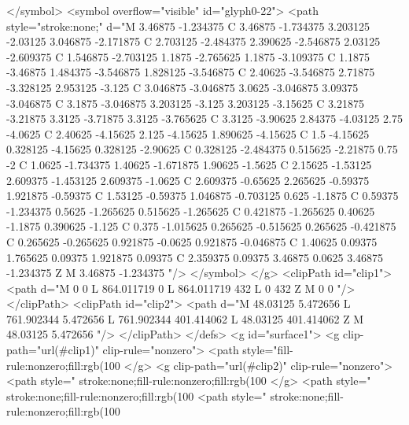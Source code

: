 </symbol>
<symbol overflow="visible" id="glyph0-22">
<path style="stroke:none;" d="M 3.46875 -1.234375 C 3.46875 -1.734375 3.203125 -2.03125 3.046875 -2.171875 C 2.703125 -2.484375 2.390625 -2.546875 2.03125 -2.609375 C 1.546875 -2.703125 1.1875 -2.765625 1.1875 -3.109375 C 1.1875 -3.46875 1.484375 -3.546875 1.828125 -3.546875 C 2.40625 -3.546875 2.71875 -3.328125 2.953125 -3.125 C 3.046875 -3.046875 3.0625 -3.046875 3.09375 -3.046875 C 3.1875 -3.046875 3.203125 -3.125 3.203125 -3.15625 C 3.21875 -3.21875 3.3125 -3.71875 3.3125 -3.765625 C 3.3125 -3.90625 2.84375 -4.03125 2.75 -4.0625 C 2.40625 -4.15625 2.125 -4.15625 1.890625 -4.15625 C 1.5 -4.15625 0.328125 -4.15625 0.328125 -2.90625 C 0.328125 -2.484375 0.515625 -2.21875 0.75 -2 C 1.0625 -1.734375 1.40625 -1.671875 1.90625 -1.5625 C 2.15625 -1.53125 2.609375 -1.453125 2.609375 -1.0625 C 2.609375 -0.65625 2.265625 -0.59375 1.921875 -0.59375 C 1.53125 -0.59375 1.046875 -0.703125 0.625 -1.1875 C 0.59375 -1.234375 0.5625 -1.265625 0.515625 -1.265625 C 0.421875 -1.265625 0.40625 -1.1875 0.390625 -1.125 C 0.375 -1.015625 0.265625 -0.515625 0.265625 -0.421875 C 0.265625 -0.265625 0.921875 -0.0625 0.921875 -0.046875 C 1.40625 0.09375 1.765625 0.09375 1.921875 0.09375 C 2.359375 0.09375 3.46875 0.0625 3.46875 -1.234375 Z M 3.46875 -1.234375 "/>
</symbol>
</g>
<clipPath id="clip1">
  <path d="M 0 0 L 864.011719 0 L 864.011719 432 L 0 432 Z M 0 0 "/>
</clipPath>
<clipPath id="clip2">
  <path d="M 48.03125 5.472656 L 761.902344 5.472656 L 761.902344 401.414062 L 48.03125 401.414062 Z M 48.03125 5.472656 "/>
</clipPath>
</defs>
<g id="surface1">
<g clip-path="url(#clip1)" clip-rule="nonzero">
<path style="fill-rule:nonzero;fill:rgb(100%
</g>
<g clip-path="url(#clip2)" clip-rule="nonzero">
<path style=" stroke:none;fill-rule:nonzero;fill:rgb(100%
</g>
<path style=" stroke:none;fill-rule:nonzero;fill:rgb(100%
<path style=" stroke:none;fill-rule:nonzero;fill:rgb(100%
